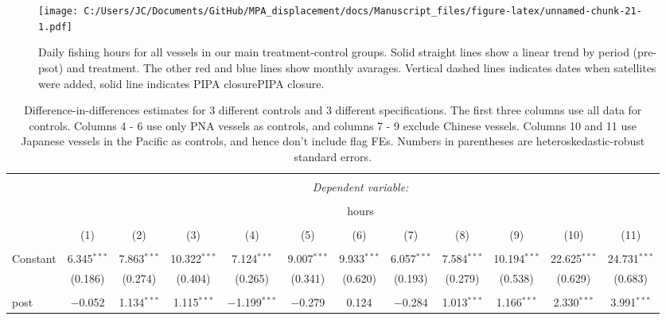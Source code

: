 \documentclass[11pt,]{article}
\begin{document}
\begin{figure}
\centering
\texttt{[image: C:/Users/JC/Documents/GitHub/MPA\_displacement/docs/Manuscript\_files/figure-latex/unnamed-chunk-21-1.pdf]}
\caption{\label{fig:unnamed-chunk-21}\label{fig:all_vessels}Daily fishing
hours for all vessels in our main treatment-control groups. Solid
straight lines show a linear trend by period (pre-psot) and treatment.
The other red and blue lines show monthly avarages. Vertical dashed
lines indicates dates when satellites were added, solid line indicates
PIPA closurePIPA closure.}
\end{figure}

\clearpage
\begin{landscape}


\begin{table}[!htbp] \centering 
  \caption{\label{tab:did}Difference-in-differences estimates for 3 different controls and 3 different specifications. The first three columns use all data for controls. Columns 4 - 6 use only PNA vessels as controls, and columns 7 - 9 exclude Chinese vessels. Columns 10 and 11 use Japanese vessels in the Pacific as controls, and hence don't include flag FEs. Numbers in parentheses are heteroskedastic-robust standard errors.} 
  \label{} 
\footnotesize 
\begin{tabular}{@{\extracolsep{1pt}}lccccccccccc} 
\\[-1.8ex]\hline 
\hline \\[-1.8ex] 
 & \multicolumn{11}{c}{\textit{Dependent variable:}} \\ 
\cline{2-12} 
\\[-1.8ex] & \multicolumn{11}{c}{hours} \\ 
\\[-1.8ex] & (1) & (2) & (3) & (4) & (5) & (6) & (7) & (8) & (9) & (10) & (11)\\ 
\hline \\[-1.8ex] 
 Constant & 6.345$^{***}$ & 7.863$^{***}$ & 10.322$^{***}$ & 7.124$^{***}$ & 9.007$^{***}$ & 9.933$^{***}$ & 6.057$^{***}$ & 7.584$^{***}$ & 10.194$^{***}$ & 22.625$^{***}$ & 24.731$^{***}$ \\ 
  & (0.186) & (0.274) & (0.404) & (0.265) & (0.341) & (0.620) & (0.193) & (0.279) & (0.538) & (0.629) & (0.683) \\ 
  & & & & & & & & & & & \\ 
 post & $-$0.052 & 1.134$^{***}$ & 1.115$^{***}$ & $-$1.199$^{***}$ & $-$0.279 & 0.124 & $-$0.284 & 1.013$^{***}$ & 1.166$^{***}$ & 2.330$^{***}$ & 3.991$^{***}$ \\ 

\end{tabular}
\end{table}
\end{landscape}
\end{document}
